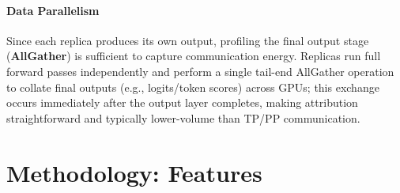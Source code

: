\paragraph{Data Parallelism} Since each replica produces its own output, profiling the final output stage (\textbf{AllGather}) is sufficient to capture communication energy. Replicas run full forward passes independently and perform a single tail-end AllGather operation to collate final outputs (e.g., logits/token scores) across GPUs; this exchange occurs immediately after the output layer completes, making attribution straightforward and typically lower-volume than TP/PP communication.

\section{Methodology: Features}
\label{appendix:features}

